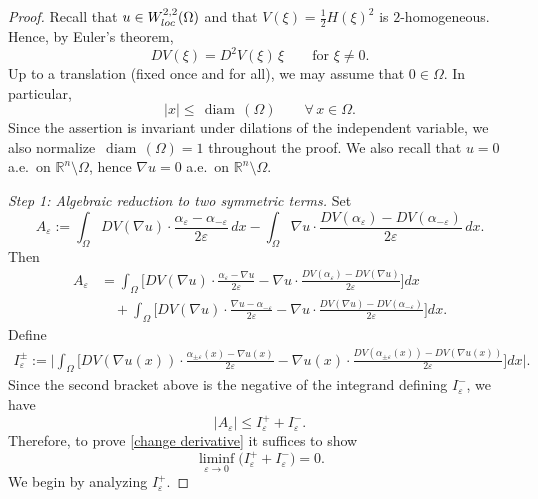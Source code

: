 \documentclass[10pt,a4paper]{amsart}
\def\diam{{\mathop\mathrm{\,diam\,}}}
\begin{document}
\begin{proof}
Recall that $u\in W^{2,2}_{\rm loc}(\Omega)$ and that $V(\xi)=\frac12 H(\xi)^2$ is $2$-homogeneous. Hence, by Euler's theorem,
\[
DV(\xi)=D^2V(\xi)\,\xi \qquad \text{for }\xi\neq 0.
\]
Up to a translation (fixed once and for all), we may assume that $0\in\Omega$. In particular,
\begin{equation}\label{eq:xbound-diam}
|x|\le \diam(\Omega)\qquad \forall\,x\in\Omega.
\end{equation}
{Since the assertion is invariant under dilations of the independent variable, we also normalize
$\diam(\Omega)=1$ throughout the proof.}
We also recall that $u=0$ a.e.\ on $\mathbb R^n\setminus\Omega$, hence $\nabla u=0$ a.e.\ on $\mathbb R^n\setminus\Omega$.

\medskip
\noindent\textit{Step 1: Algebraic reduction to two symmetric terms.}
Set
\[
A_\varepsilon:=
\int_{\Omega} DV(\nabla u)\cdot \frac{\alpha_{\varepsilon}-\alpha_{-\varepsilon}}{2\varepsilon}\,dx
-
\int_{\Omega} \nabla u\cdot \frac{DV(\alpha_{\varepsilon})-DV(\alpha_{-\varepsilon})}{2\varepsilon}\,dx.
\]
Then
\begin{align*}
A_\varepsilon
&=\int_{\Omega} \Bigg[
DV(\nabla u)\cdot \frac{\alpha_{\varepsilon}-\nabla u}{2\varepsilon}
-\nabla u\cdot \frac{DV(\alpha_{\varepsilon})-DV(\nabla u)}{2\varepsilon}
\Bigg]dx\\
&\quad +\int_{\Omega} \Bigg[
DV(\nabla u)\cdot \frac{\nabla u-\alpha_{-\varepsilon}}{2\varepsilon}
-\nabla u\cdot \frac{DV(\nabla u)-DV(\alpha_{-\varepsilon})}{2\varepsilon}
\Bigg]dx.
\end{align*}
Define
\begin{align*}
I_\varepsilon^\pm
:=\Bigg|\int_{\Omega} \Bigg[
DV(\nabla u(x))\cdot \frac{\alpha_{\pm\varepsilon}(x)-\nabla u(x)}{2\varepsilon}
-\nabla u(x)\cdot \frac{DV(\alpha_{\pm\varepsilon}(x))-DV(\nabla u(x))}{2\varepsilon}
\Bigg]dx\Bigg|.
\end{align*}
Since the second bracket above is the negative of the integrand defining $I_\varepsilon^-$, we have
\[
|A_\varepsilon|\le I_\varepsilon^+ + I_\varepsilon^-.
\]
Therefore, to prove \eqref{change derivative} it suffices to show
\[
\liminf_{\varepsilon\to 0}\big(I_\varepsilon^+ + I_\varepsilon^-\big)=0.
\]
We begin by analyzing $I_\varepsilon^+$.


\end{proof}
\end{document}
